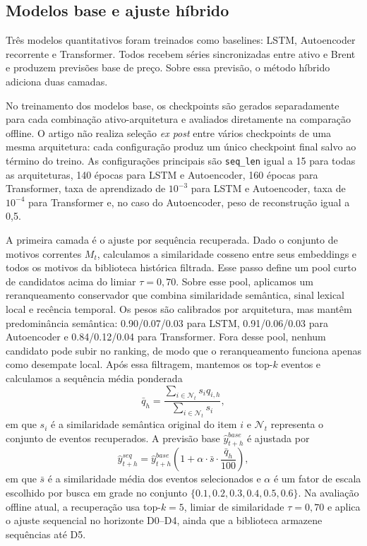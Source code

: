 \documentclass[12pt]{article}
\begin{document}
\subsection{Modelos base e ajuste híbrido}

Três modelos quantitativos foram treinados como baselines: LSTM, Autoencoder recorrente e Transformer. Todos recebem séries sincronizadas entre ativo e Brent e produzem previsões base de preço. Sobre essa previsão, o método híbrido adiciona duas camadas.

No treinamento dos modelos base, os checkpoints são gerados separadamente para cada combinação ativo-arquitetura e avaliados diretamente na comparação offline. O artigo não realiza seleção \textit{ex post} entre vários checkpoints de uma mesma arquitetura: cada configuração produz um único checkpoint final salvo ao término do treino. As configurações principais são \texttt{seq\_len} igual a 15 para todas as arquiteturas, 140 épocas para LSTM e Autoencoder, 160 épocas para Transformer, taxa de aprendizado de $10^{-3}$ para LSTM e Autoencoder, taxa de $10^{-4}$ para Transformer e, no caso do Autoencoder, peso de reconstrução igual a 0,5.

A primeira camada é o ajuste por sequência recuperada. Dado o conjunto de motivos correntes $M_t$, calculamos a similaridade cosseno entre seus embeddings e todos os motivos da biblioteca histórica filtrada. Esse passo define um pool curto de candidatos acima do limiar $\tau = 0{,}70$. Sobre esse pool, aplicamos um reranqueamento conservador que combina similaridade semântica, sinal lexical local e recência temporal. Os pesos são calibrados por arquitetura, mas mantêm predominância semântica: 0.90/0.07/0.03 para LSTM, 0.91/0.06/0.03 para Autoencoder e 0.84/0.12/0.04 para Transformer. Fora desse pool, nenhum candidato pode subir no ranking, de modo que o reranqueamento funciona apenas como desempate local. Após essa filtragem, mantemos os top-$k$ eventos e calculamos a sequência média ponderada
\[
\bar{q}_h = \frac{\sum_{i \in \mathcal{N}_t} s_i q_{i,h}}{\sum_{i \in \mathcal{N}_t} s_i},
\]
em que $s_i$ é a similaridade semântica original do item $i$ e $\mathcal{N}_t$ representa o conjunto de eventos recuperados. A previsão base $\hat{y}^{base}_{t+h}$ é ajustada por
\[
\hat{y}^{seq}_{t+h} = \hat{y}^{base}_{t+h}\left(1 + \alpha \cdot \bar{s} \cdot \frac{\bar{q}_h}{100}\right),
\]
em que $\bar{s}$ é a similaridade média dos eventos selecionados e $\alpha$ é um fator de escala escolhido por busca em grade no conjunto $\{0.1, 0.2, 0.3, 0.4, 0.5, 0.6\}$. Na avaliação offline atual, a recuperação usa top-$k=5$, limiar de similaridade $\tau = 0{,}70$ e aplica o ajuste sequencial no horizonte D0--D4, ainda que a biblioteca armazene sequências até D5.
\end{document}
